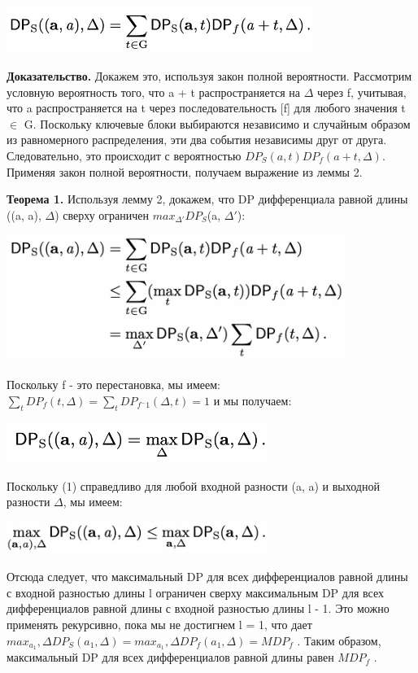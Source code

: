 \documentclass[utf8,14pt,a4paper,oneside,russian]{book}
\begin{document}
\includegraphics[width=10cm]{form10}

\textbf{Доказательство.} Докажем это, используя закон полной вероятности. 
Рассмотрим условную вероятность того, что a + t распространяется на $\Delta$ 
через f, учитывая, что a распространяется на t через последовательность [f] 
для любого значения t $\in$ G. Поскольку ключевые блоки выбираются независимо 
и случайным образом из равномерного распределения, эти два события независимы 
друг от друга. Следовательно, это происходит с вероятностью 
$DP_S(a, t)DP_f (a + t, \Delta)$. Применяя закон полной вероятности, получаем 
выражение из леммы 2.

\textbf{Теорема 1.} Используя лемму 2, докажем, что DP дифференциала 
равной длины ((a, a), $\Delta$) сверху ограничен 
$max_{\Delta'} DP_S$(a, $\Delta'$):

\includegraphics[width=11cm]{form11}

Поскольку f - это перестановка, мы имеем: \\
$\sum_t DP_f(t,\Delta) = \sum_t DP_{f^-1}(\Delta, t) = 1$ и мы получаем:

\includegraphics[width=8.5cm]{form12}

Поскольку (1) справедливо для любой входной разности (a, a) и
 выходной разности $\Delta$, мы имеем: 

 \includegraphics[width=8.5cm]{form13}

 Отсюда следует, что максимальный DP для всех дифференциалов равной длины 
 с входной разностью длины l ограничен сверху максимальным DP для всех 
 дифференциалов равной длины с входной разностью длины l - 1. Это можно 
 применять рекурсивно, пока мы не достигнем l = 1, что дает 
 $max_{a_1},\Delta DP_S(a_1, \Delta) = max_{a_1},\Delta DP_f (a_1, \Delta) = MDP_f$ . 
 Таким образом, максимальный DP для всех дифференциалов равной длины 
 равен $MDP_f$ .
\end{document}
